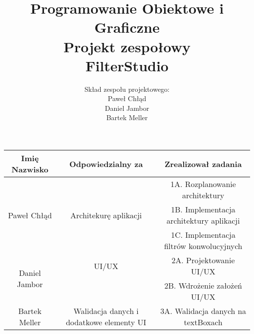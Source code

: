 \documentclass{article}
\title{Programowanie Obiektowe i Graficzne\\
Projekt zespołowy\\
\textbf{FilterStudio}}
\author{Skład zespołu projektowego: \\ Paweł Chłąd\\Daniel Jambor\\ Bartek Meller }
\begin{document}
\maketitle

\begin{center}
    \begin{tabular}{ |c|c|c| }
        \hline
        Imię Nazwisko                  & Odpowiedzialny za                        & Zrealizował zadania                      \\ \hline
        \multirow{3}{*}{Paweł Chłąd}   &                                          & 1A. Rozplanowanie architektury           \\
                                       & Architekurę aplikacji                    & 1B. Implementacja architektury aplikacji \\
                                       &                                          & 1C. Implementacja filtrów konwolucyjnych \\ \hline
        \multirow{2}{*}{Daniel Jambor} & UI/UX                                    & 2A. Projektowanie UI/UX                  \\
                                       &                                          & 2B. Wdrożenie założeń UI/UX              \\ \hline
        Bartek Meller                  & Walidacja danych i dodatkowe elementy UI & 3A. Walidacja danych na textBoxach       \\ \hline
    \end{tabular}
\end{center}


\pagebreak
\end{document}
